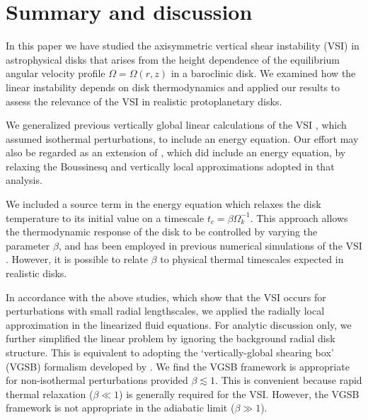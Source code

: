 \section{Summary and discussion}\label{summary}
In this paper we have studied the  axisymmetric vertical shear
instability (VSI) in astrophysical disks that arises from the
height dependence of the equilibrium angular velocity profile
$\Omega=\Omega(r,z)$ in a baroclinic disk. We examined how
the linear instability depends on disk thermodynamics and applied our
results to assess the relevance of the VSI in realistic protoplanetary
disks.  

We generalized previous vertically global linear 
calculations of the VSI \citep{nelson13,mcnally14}, which assumed isothermal
perturbations, to include an energy equation. Our effort may also be
regarded as an extension of \cite{urpin03}, which did include an
energy equation, by relaxing the Boussinesq and vertically local
approximations adopted in that analysis.      

We included a source term in the energy equation which relaxes the disk
temperature to its initial value on a timescale
$t_c=\beta\Omega_k^{-1}$. This approach allows the thermodynamic
response of the disk to be controlled by varying the parameter
$\beta$, and has been employed in previous numerical simulations of
the VSI \citep{nelson13}. However, it is possible to 
relate  $\beta$ to physical thermal timescales expected in realistic disks.  

In accordance with the above studies, which show that the VSI occurs for 
perturbations with small radial lengthscales, we applied the 
radially local approximation in the linearized fluid equations. For
analytic discussion only, we further simplified the linear problem by
ignoring the background radial disk structure. This is equivalent to adopting
the `vertically-global shearing box' (VGSB) formalism developed by
\cite{mcnally14}. %
We find the VGSB framework is appropriate for non-isothermal
perturbations provided $\beta\lesssim1$.  This is convenient because
rapid thermal relaxation ($\beta\ll1$) is 
generally required for the VSI.  However, the VGSB framework is not
appropriate in the adiabatic limit ($\beta \gg 1$). 
   

